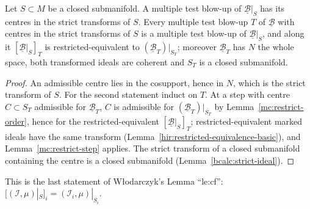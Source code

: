 \begin{lemma}
\label{mc:restrict-tower}
\leanok
Let \(S\subset M\) be a closed submanifold. A multiple test blow-up of \(\underline{\mathcal B}|_S\) has its centres in the strict transforms of \(S\).
Every multiple test blow-up \(T\) of \(\underline{\mathcal B}\) with centres in the strict transforms of \(S\) is a multiple test blow-up of
\(\underline{\mathcal B}|_S\), and along it \([\underline{\mathcal B}|_S]_T\) is restricted-equivalent to \((\underline{\mathcal B}_T)|_{S_T}\); moreover
\(\underline{\mathcal B}_T\) has \(N\) the whole space, both transformed ideals are coherent and \(S_T\) is a closed submanifold.
\end{lemma}
\begin{proof}
\leanok
An admissible centre lies in the cosupport, hence in \(N\), which is the strict transform of \(S\). For the second statement induct on \(T\). At a step
with centre \(C\subset S_T\) admissible for \(\underline{\mathcal B}_T\), \(C\) is admissible for \((\underline{\mathcal B}_T)|_{S_T}\) by
Lemma~\ref{mc:restrict-order}, hence for the restricted-equivalent \([\underline{\mathcal B}|_S]_T\); restricted-equivalent marked ideals have the same
transform (Lemma~\ref{hir:restricted-equivalence-basic}), and Lemma~\ref{mc:restrict-step} applies. The strict transform of a closed submanifold
containing the centre is a closed submanifold (Lemma~\ref{bcalc:strict-ideal}).
\end{proof}
This is the last statement of Włodarczyk's Lemma ``le:cf'': \([(\mathcal I,\mu)|_S]_i=(\mathcal I_i,\mu)|_{S_i}\).


